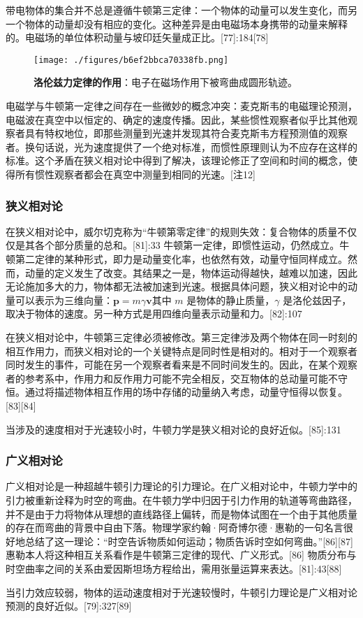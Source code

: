 带电物体的集合并不总是遵循牛顿第三定律：一个物体的动量可以发生变化，而另一个物体的动量却没有相应的变化。这种差异是由电磁场本身携带的动量来解释的。电磁场的单位体积动量与坡印廷矢量成正比。[77]:184[78]
\begin{figure}[ht]
\centering
\texttt{[image: ./figures/b6ef2bbca70338fb.png]}
\caption{\textbf{洛伦兹力定律的作用}：电子在磁场作用下被弯曲成圆形轨迹。} \label{fig_NEW01_13}
\end{figure}
电磁学与牛顿第一定律之间存在一些微妙的概念冲突：麦克斯韦的电磁理论预测，电磁波在真空中以恒定的、确定的速度传播。因此，某些惯性观察者似乎比其他观察者具有特权地位，即那些测量到光速并发现其符合麦克斯韦方程预测值的观察者。换句话说，光为速度提供了一个绝对标准，而惯性原理则认为不应存在这样的标准。这个矛盾在狭义相对论中得到了解决，该理论修正了空间和时间的概念，使得所有惯性观察者都会在真空中测量到相同的光速。[注12]
\subsubsection{狭义相对论}  

在狭义相对论中，威尔切克称为“牛顿第零定律”的规则失效：复合物体的质量不仅仅是其各个部分质量的总和。[81]:33 牛顿第一定律，即惯性运动，仍然成立。牛顿第二定律的某种形式，即力是动量变化率，也依然有效，动量守恒同样成立。然而，动量的定义发生了改变。其结果之一是，物体运动得越快，越难以加速，因此无论施加多大的力，物体都无法被加速到光速。根据具体问题，狭义相对论中的动量可以表示为三维向量：\(\mathbf{p} = m\gamma \mathbf{v}\)其中 \( m \) 是物体的静止质量，\( \gamma \) 是洛伦兹因子，取决于物体的速度。另一种方式是用四维向量表示动量和力。[82]:107

在狭义相对论中，牛顿第三定律必须被修改。第三定律涉及两个物体在同一时刻的相互作用力，而狭义相对论的一个关键特点是同时性是相对的。相对于一个观察者同时发生的事件，可能在另一个观察者看来是不同时间发生的。因此，在某个观察者的参考系中，作用力和反作用力可能不完全相反，交互物体的总动量可能不守恒。通过将描述物体相互作用的场中存储的动量纳入考虑，动量守恒得以恢复。[83][84]

当涉及的速度相对于光速较小时，牛顿力学是狭义相对论的良好近似。[85]:131
\subsubsection{广义相对论}
广义相对论是一种超越牛顿引力理论的引力理论。在广义相对论中，牛顿力学中的引力被重新诠释为时空的弯曲。在牛顿力学中归因于引力作用的轨道等弯曲路径，并不是由于力将物体从理想的直线路径上偏转，而是物体试图在一个由于其他质量的存在而弯曲的背景中自由下落。物理学家约翰·阿奇博尔德·惠勒的一句名言很好地总结了这一理论：“时空告诉物质如何运动；物质告诉时空如何弯曲。”[86][87] 惠勒本人将这种相互关系看作是牛顿第三定律的现代、广义形式。[86] 物质分布与时空曲率之间的关系由爱因斯坦场方程给出，需用张量运算来表达。[81]:43[88]

当引力效应较弱，物体的运动速度相对于光速较慢时，牛顿引力理论是广义相对论预测的良好近似。[79]:327[89]